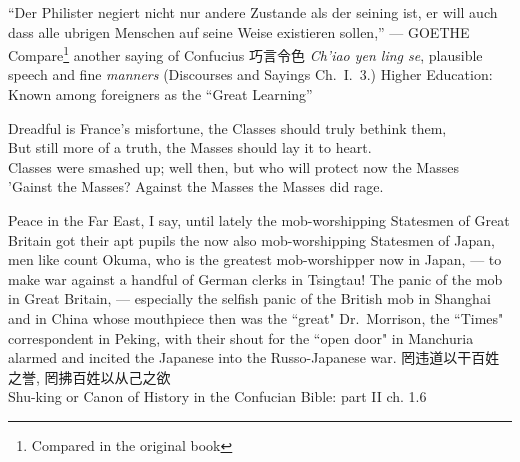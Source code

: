 \begin{thebibliography}{30}
     ``Der Philister negiert nicht nur andere Zustande als der seining ist, er will auch dass alle ubrigen Menschen auf seine Weise existieren sollen,'' --- GOETHE
     Compare\footnote{Compared in the original book} another saying of Confucius 巧言令色 \emph{Ch'iao yen ling se}, plausible speech and fine \emph{manners} (Discourses and Sayings Ch.~I.~3.)
     Higher Education: Known among foreigners as the ``Great Learning''
     \begin{center}
    Dreadful is France's misfortune, the Classes should truly bethink them, \\
    But still more of a truth, the Masses should lay it to heart.\\
    Classes were smashed up; well then, but who will protect now the Masses\\
    'Gainst the Masses? Against the Masses the Masses did rage. \\
\end{center}
     Peace in the Far East, I say, until lately the mob-worshipping Statesmen of Great Britain got their apt pupils the now also mob-worshipping Statesmen of Japan, men like count Okuma, who is the greatest mob-worshipper now in Japan, --- to make war against a handful of German clerks in Tsingtau!
     The panic of the mob in Great Britain, --- especially the selfish panic of the British mob in Shanghai and in China whose mouthpiece then was the ``great" Dr.~Morrison, the ``Times" correspondent in Peking, with their shout for the ``open door" in Manchuria alarmed and incited the Japanese into the Russo-Japanese war.
     罔违道以干百姓之誉, 罔拂百姓以从己之欲 \\ Shu-king or Canon of History in the Confucian Bible: part II ch. 1.6
\end{thebibliography}
